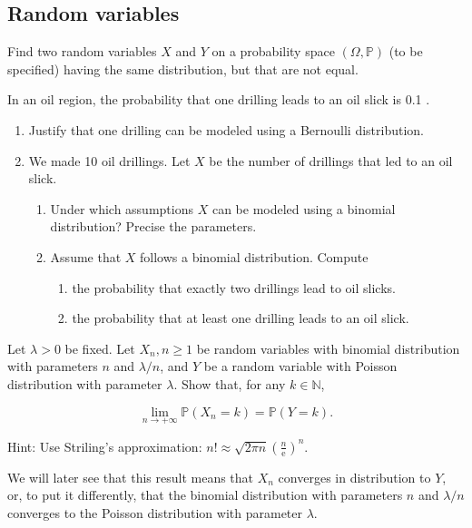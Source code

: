 \begin{center}
  \section*{Random variables}
\end{center}

\begin{Exercise}
  Find two random variables $X$ and $Y$ on a probability space $(\Omega, \mathbb{P})$ (to be specified) having the same distribution, but that are not equal.
\end{Exercise}

\begin{Exercise}
  In an oil region, the probability that one drilling leads to an oil slick is 0.1 .
  \begin{enumerate}
    \item Justify that one drilling can be modeled using a Bernoulli distribution.
    \item We made 10 oil drillings. Let $X$ be the number of drillings that led to an oil slick.
          \begin{enumerate}
            \item Under which assumptions $X$ can be modeled using a binomial distribution? Precise the parameters.
            \item Assume that $X$ follows a binomial distribution. Compute
                  \begin{enumerate}
                    \item the probability that exactly two drillings lead to oil slicks.
                    \item the probability that at least one drilling leads to an oil slick.
                  \end{enumerate}
          \end{enumerate}
  \end{enumerate}
\end{Exercise}

\begin{Exercise}
  Let $\lambda>0$ be fixed. Let $X_{n}, n \geq 1$ be random variables with binomial distribution with parameters $n$ and $\lambda / n$, and $Y$ be a random variable with Poisson distribution with parameter $\lambda$. Show that, for any $k \in \mathbb{N}$,

  $$
    \lim _{n \rightarrow+\infty} \mathbb{P}\left(X_{n}=k\right)=\mathbb{P}(Y=k) .
  $$

  Hint: Use Striling's approximation: $n ! \approx \sqrt{2 \pi n}\left(\frac{n}{\mathrm{e}}\right)^{n}$.

  We will later see that this result means that $X_{n}$ converges in distribution to $Y$, or, to put it differently, that the binomial distribution with parameters $n$ and $\lambda / n$ converges to the Poisson distribution with parameter $\lambda$.
\end{Exercise}

